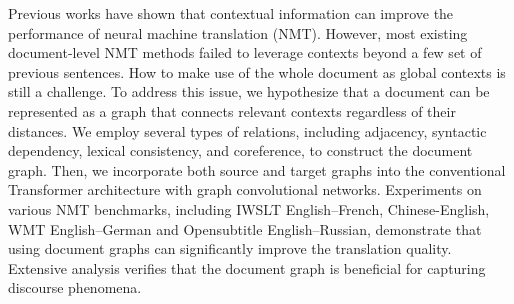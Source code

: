 Previous works have shown that contextual information can improve the performance of neural machine translation (NMT). However, most existing document-level NMT methods failed to leverage contexts beyond a few set of previous sentences. How to make use of the whole document as global contexts is still a challenge. To address this issue, we hypothesize that a document can be represented as a graph that connects relevant contexts regardless of their distances. We employ several types of relations, including adjacency, syntactic dependency, lexical consistency, and coreference, to construct the document graph. Then, we incorporate both source and target graphs into the conventional Transformer architecture with graph convolutional networks. Experiments on various NMT benchmarks, including IWSLT English--French, Chinese-English, WMT English--German and Opensubtitle English--Russian, demonstrate that using document graphs can significantly improve the translation quality. Extensive analysis verifies that the document graph is beneficial for capturing discourse phenomena.
